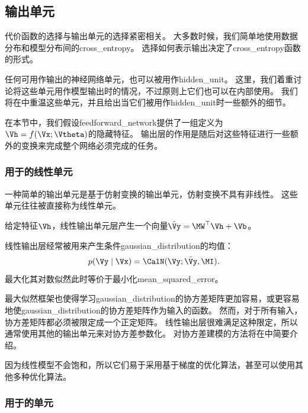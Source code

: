\subsection{输出单元}
\label{sec:output_units}

代价函数的选择与输出单元的选择紧密相关。
大多数时候，我们简单地使用数据分布和模型分布间的\gls{cross_entropy}。
选择如何表示输出决定了\gls{cross_entropy}函数的形式。

任何可用作输出的神经网络单元，也可以被用作\gls{hidden_unit}。
这里，我们着重讨论将这些单元用作模型输出时的情况，不过原则上它们也可以在内部使用。
我们将在中重温这些单元，并且给出当它们被用作\gls{hidden_unit}时一些额外的细节。

在本节中，我们假设\gls{feedforward_network}提供了一组定义为$\Vh=f(\Vx;\Vtheta)$的隐藏特征。
输出层的作用是随后对这些特征进行一些额外的变换来完成整个网络必须完成的任务。


\subsubsection{用于的线性单元}
\label{sec:linear_units_for_gaussian_output_distributions}

一种简单的输出单元是基于仿射变换的输出单元，仿射变换不具有非线性。
这些单元往往被直接称为线性单元。

给定特征$\Vh$，线性输出单元层产生一个向量$\hat{\Vy} = \MW^\top \Vh+\Vb$。

线性输出层经常被用来产生条件\gls{gaussian_distribution}的均值：
\begin{equation}
p(\Vy\mid\Vx) = \CalN(\Vy; \hat{\Vy}, \MI ).
\end{equation}
最大化其对数似然此时等价于最小化\gls{mean_squared_error}。

最大似然框架也使得学习\gls{gaussian_distribution}的协方差矩阵更加容易，或更容易地使\gls{gaussian_distribution}的协方差矩阵作为输入的函数。
然而，对于所有输入，协方差矩阵都必须被限定成一个正定矩阵。
线性输出层很难满足这种限定，所以通常使用其他的输出单元来对协方差参数化。
对协方差建模的方法将在中简要介绍。

因为线性模型不会饱和，所以它们易于采用基于梯度的优化算法，甚至可以使用其他多种优化算法。

\subsubsection{用于的单元}
\label{sec:sigmoid_units_for_bernoulli_output_distributions}

